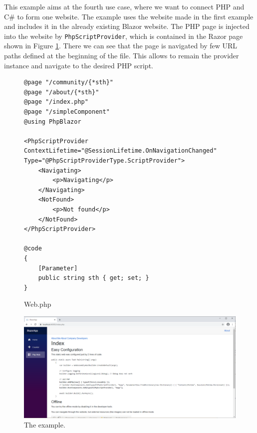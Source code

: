 This example aims at the fourth use case, where we want to connect PHP and C\# to form one website.
The example uses the website made in the first example and includes it in the already existing Blazor website.
The PHP page is injected into the website by \texttt{PhpScriptProvider}, which is contained in the Razor page shown in Figure \ref{img29:razor}.
There we can see that the page is navigated by few URL paths defined at the beginning of the file.
This allows to remain the provider instance and navigate to the desired PHP script.
\par
\begin{figure}[H]
\begin{lstlisting}
@page "/community/{*sth}"
@page "/about/{*sth}"
@page "/index.php"
@page "/simpleComponent"
@using PhpBlazor

<PhpScriptProvider ContextLifetime="@SessionLifetime.OnNavigationChanged" Type="@PhpScriptProviderType.ScriptProvider">
    <Navigating>
        <p>Navigating</p>
    </Navigating>
    <NotFound>
        <p>Not found</p>
    </NotFound>
</PhpScriptProvider>

@code
{
    [Parameter]
    public string sth { get; set; }
}
\end{lstlisting}
\caption{Web.php}
\label{img29:razor}
\end{figure}
\par
\begin{figure}[H]\centering
\includegraphics[scale=0.4]{./img/AllTogether}
\caption{The example.}
\label{img30:allTogether}
\end{figure} 